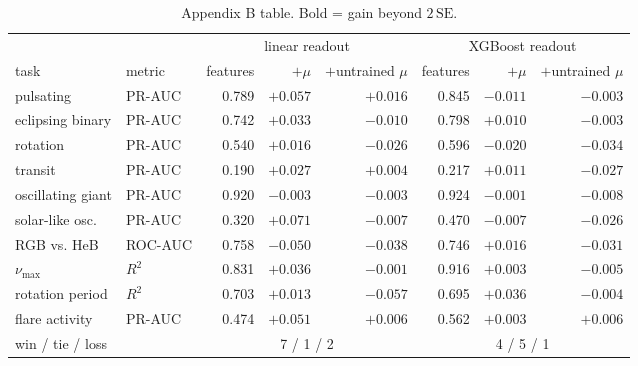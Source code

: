 \documentclass{article}
\begin{document}
\begin{table}[h]\caption{Appendix B table. Bold = gain beyond $2\,\mathrm{SE}$.}
\centering\scriptsize
\begin{tabular}{llrrrrrr}
\toprule
 & & \multicolumn{3}{c}{linear readout} & \multicolumn{3}{c}{XGBoost readout} \\
\cmidrule(lr){3-5}\cmidrule(lr){6-8}
task & metric & features & $+\mu$ & $+$untrained $\mu$ & features & $+\mu$ & $+$untrained $\mu$ \\
\midrule
pulsating & PR-AUC & 0.789 & $\mathbf{+0.057}$ & $+0.016$ & 0.845 & $-0.011$ & $-0.003$ \\
eclipsing binary & PR-AUC & 0.742 & $\mathbf{+0.033}$ & $-0.010$ & 0.798 & $\mathbf{+0.010}$ & $-0.003$ \\
rotation & PR-AUC & 0.540 & $+0.016$ & $-0.026$ & 0.596 & $\mathbf{-0.020}$ & $-0.034$ \\
transit & PR-AUC & 0.190 & $\mathbf{+0.027}$ & $+0.004$ & 0.217 & $+0.011$ & $-0.027$ \\
oscillating giant & PR-AUC & 0.920 & $\mathbf{-0.003}$ & $-0.003$ & 0.924 & $-0.001$ & $-0.008$ \\
solar-like osc. & PR-AUC & 0.320 & $\mathbf{+0.071}$ & $-0.007$ & 0.470 & $-0.007$ & $-0.026$ \\
RGB vs. HeB & ROC-AUC & 0.758 & $\mathbf{-0.050}$ & $-0.038$ & 0.746 & $\mathbf{+0.016}$ & $-0.031$ \\
$\nu_{\max}$ & $R^2$ & 0.831 & $\mathbf{+0.036}$ & $-0.001$ & 0.916 & $\mathbf{+0.003}$ & $-0.005$ \\
rotation period & $R^2$ & 0.703 & $\mathbf{+0.013}$ & $-0.057$ & 0.695 & $\mathbf{+0.036}$ & $-0.004$ \\
flare activity & PR-AUC & 0.474 & $\mathbf{+0.051}$ & $+0.006$ & 0.562 & $+0.003$ & $+0.006$ \\
\midrule
win / tie / loss & & \multicolumn{3}{c}{7 / 1 / 2} & \multicolumn{3}{c}{4 / 5 / 1} \\
\bottomrule
\end{tabular}
\end{table}
\end{document}
